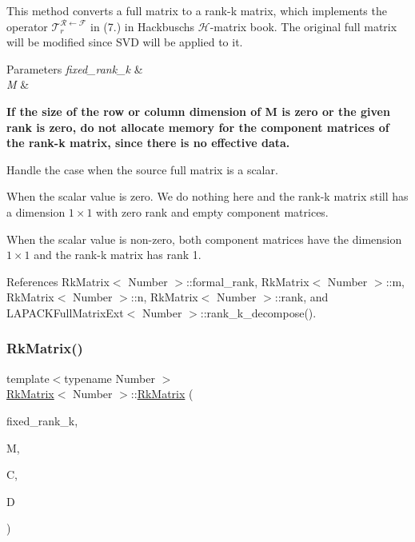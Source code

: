 \begin{DoxyDescription}
\item[Note ]This method converts a full matrix to a rank-\/k matrix, which implements the operator $\mathcal{T}_{r}^{\mathcal{R} \leftarrow \mathcal{F}}$ in (7.) in Hackbusch\textquotesingle{}s $\mathcal{H}$-\/matrix book. The original full matrix {\ttfamily will} be modified since S\+VD will be applied to it. 
\end{DoxyDescription}
\begin{DoxyParams}{Parameters}
{\em fixed\+\_\+rank\+\_\+k} & \\
\hline
{\em M} & \\
\hline
\end{DoxyParams}
{\bfseries If the size of the row or column dimension of {\ttfamily M} is zero or the given rank is zero, do not allocate memory for the component matrices of the rank-\/k matrix, since there is no effective data.}

Handle the case when the source full matrix is a scalar.

When the scalar value is zero. We do nothing here and the rank-\/k matrix still has a dimension $1 \times 1$ with zero rank and empty component matrices.

When the scalar value is non-\/zero, both component matrices have the dimension $1 \times 1$ and the rank-\/k matrix has rank 1.

References Rk\+Matrix$<$ Number $>$\+::formal\+\_\+rank, Rk\+Matrix$<$ Number $>$\+::m, Rk\+Matrix$<$ Number $>$\+::n, Rk\+Matrix$<$ Number $>$\+::rank, and L\+A\+P\+A\+C\+K\+Full\+Matrix\+Ext$<$ Number $>$\+::rank\+\_\+k\+\_\+decompose().

\mbox{\label{classRkMatrix_afd9d75ce0a42585337d4c630d5e08140}} 
\subsubsection{\texorpdfstring{Rk\+Matrix()}{RkMatrix()}\hspace{0.1cm}{\footnotesize\ttfamily [4/19]}}
{\footnotesize\ttfamily template$<$typename Number $>$ \\
\hyperlink{classRkMatrix}{Rk\+Matrix}$<$ Number $>$\+::\hyperlink{classRkMatrix}{Rk\+Matrix} (\begin{DoxyParamCaption}\item[{const \hyperlink{classRkMatrix_add060bfc3a4cc77f858c3d6dd58cadd5}{size\+\_\+type}}]{fixed\+\_\+rank\+\_\+k,  }\item[{\hyperlink{classLAPACKFullMatrixExt}{L\+A\+P\+A\+C\+K\+Full\+Matrix\+Ext}$<$ Number $>$ \&}]{M,  }\item[{\hyperlink{classLAPACKFullMatrixExt}{L\+A\+P\+A\+C\+K\+Full\+Matrix\+Ext}$<$ Number $>$ \&}]{C,  }\item[{\hyperlink{classLAPACKFullMatrixExt}{L\+A\+P\+A\+C\+K\+Full\+Matrix\+Ext}$<$ Number $>$ \&}]{D }\end{DoxyParamCaption})}


